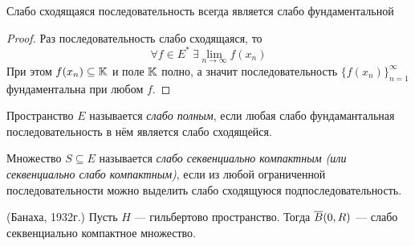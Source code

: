 \begin{proposition}
	Слабо сходящаяся последовательность всегда является слабо фундаментальной
\end{proposition}

\begin{proof}
	Раз последовательность слабо сходящаяся, то
	\[
		\forall f \in E^*\ \exists \lim_{n \to \infty} f(x_n)
	\]
	При этом $f(x_n) \subseteq \mathbb{K}$ и поле $\mathbb{K}$ полно, а значит последовательность $\{f(x_n)\}_{n = 1}^\infty$ фундаментальна при любом $f$.
\end{proof}

\begin{definition}
	Пространство $E$ называется \textit{слабо полным}, если любая слабо фундамантальная последовательность в нём является слабо сходящейся.
\end{definition}

\begin{definition}
	Множество $S \subseteq E$ называется \textit{слабо секвенциально компактным (или секвенциально слабо компактным)}, если из любой ограниченной последовательности можно выделить слабо сходящуюся подпоследовательность.
\end{definition}

\begin{theorem} (Банаха, 1932г.)
	Пусть $H$ --- гильбертово пространство. Тогда $\overline{B}(0, R)$ --- слабо секвенциально компактное множество.
\end{theorem}

